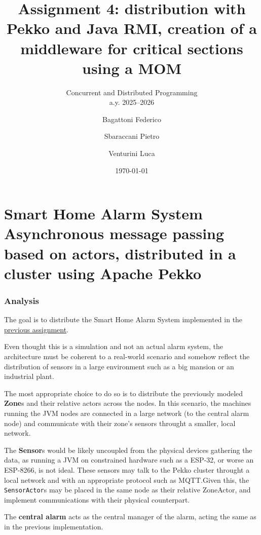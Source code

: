 \documentclass{scrartcl}
\title{\LARGE Assignment 4: distribution with Pekko and Java RMI, creation of a middleware for critical sections using a MOM}
\subtitle{Concurrent and Distributed Programming\\a.y. 2025--2026}
\author{
    Bagattoni Federico \and Sbaraccani Pietro \and Venturini Luca
}
\date{\today}
\begin{document}

    \maketitle

    \tableofcontents

    \clearpage
    \part[Extension of Smart Home Alarm System]{Smart Home Alarm System \\ \LARGE{Asynchronous message passing based on actors, distributed in a cluster using Apache Pekko}}

    \section{Analysis}\label{sec:alarm-analysis}
    The goal is to distribute the Smart Home Alarm System implemented in the \href{https://github.com/bagarozzi/pcd-25/tree/3f8c6f27e9e44c2a17f87c5eae827dfdc428e8c7/assignment-03}{previous assignment}.

    Even thought this is a simulation and not an actual alarm system, the architecture
    must be coherent to a real-world scenario and somehow reflect the distribution of
    sensors in a large environment such as a big mansion or an industrial plant.

    The most appropriate choice to do so is to distribute the previously modeled \textbf{Zone}s
    and their relative actors across the nodes. In this scenario, the machines running the JVM nodes
    are connected in a large network (to the central alarm node) and communicate with their
    zone's sensors throught a smaller, local network.

    The \textbf{Sensor}s would be likely uncoupled from the physical devices gathering the data,
    as running a JVM on constrained hardware such as a ESP-32, or worse an ESP-8266, is not ideal.
    These sensors may talk to the Pekko cluster throught a local network and with an appropriate protocol
    such as MQTT.\@ Given this, the \texttt{SensorActor}s may be placed in the same node as
    their relative ZoneActor, and implement communications with their physical counterpart.

    The \textbf{central alarm} acts as the central manager of the alarm, acting the same as in the previous implementation.
\end{document}
